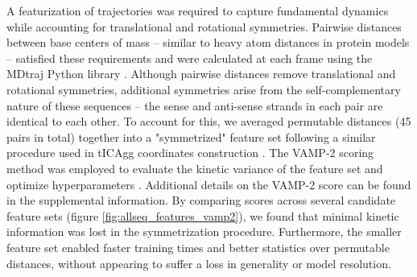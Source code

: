 \documentclass[journal=jpcbfk,manuscript=article]{achemso}
\begin{document}
A featurization of trajectories was required to capture fundamental dynamics while accounting for translational and rotational symmetries. Pairwise distances between base centers of mass -- similar to heavy atom distances in protein models \citep{Sidky}-- satisfied these requirements and were calculated at each frame using the MDtraj Python library \citep{McGibbon2015MDTraj:Trajectories}. Although pairwise distances remove translational and rotational symmetries, additional symmetries arise from the self-complementary nature of these sequences -- the sense and anti-sense strands in each pair are identical to each other. To account for this, we averaged permutable distances (45 pairs in total) together into a "symmetrized" feature set following a similar procedure used in tICAgg coordinates construction \citep{Sengupta2019AutomatedSelf-assembly}. The VAMP-2 scoring method was employed to evaluate the kinetic variance of the feature set and optimize hyperparameters \citep{WuVariationalData, Mardt2018VAMPnetsKinetics}. Additional details on the VAMP-2 score can be found in the supplemental information. By comparing scores across several candidate feature sets (figure \ref{fig:allseq_features_vamp2}), we found that minimal kinetic information was lost in the  symmetrization procedure. Furthermore, the smaller feature set enabled faster training times and better statistics over permutable distances, without appearing to suffer a loss in generality or model resolution.  
\end{document}
